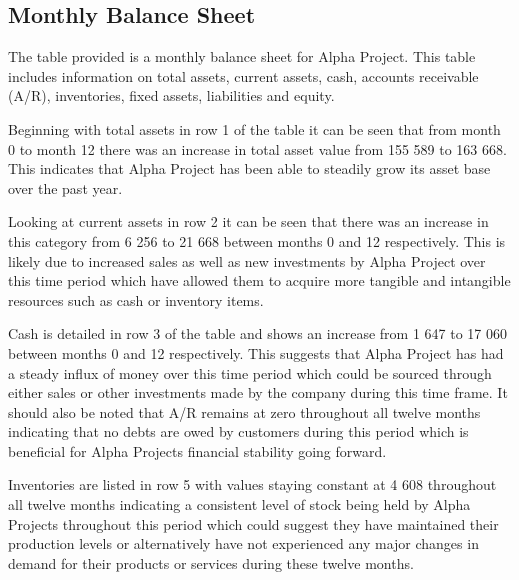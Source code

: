

\subsection{Monthly Balance Sheet}\label{sec:title}

The table provided is a monthly balance sheet for Alpha Project. This table includes information on total assets, current assets, cash, accounts receivable (A/R), inventories, fixed assets, liabilities and equity. 

Beginning with total assets in row 1 of the table it can be seen that from month 0 to month 12 there was an increase in total asset value from 155 589 to 163 668. This indicates that Alpha Project has been able to steadily grow its asset base over the past year. 

Looking at current assets in row 2 it can be seen that there was an increase in this category from 6 256 to 21 668 between months 0 and 12 respectively. This is likely due to increased sales as well as new investments by Alpha Project over this time period which have allowed them to acquire more tangible and intangible resources such as cash or inventory items. 

Cash is detailed in row 3 of the table and shows an increase from 1 647 to 17 060 between months 0 and 12 respectively. This suggests that Alpha Project has had a steady influx of money over this time period which could be sourced through either sales or other investments made by the company during this time frame. 
It should also be noted that A/R remains at zero throughout all twelve months indicating that no debts are owed by customers during this period which is beneficial for Alpha Projects financial stability going forward. 

 Inventories are listed in row 5 with values staying constant at 4 608 throughout all twelve months indicating a consistent level of stock being held by Alpha Projects throughout this period which could suggest they have maintained their production levels or alternatively have not experienced any major changes in demand for their products or services during these twelve months.  

